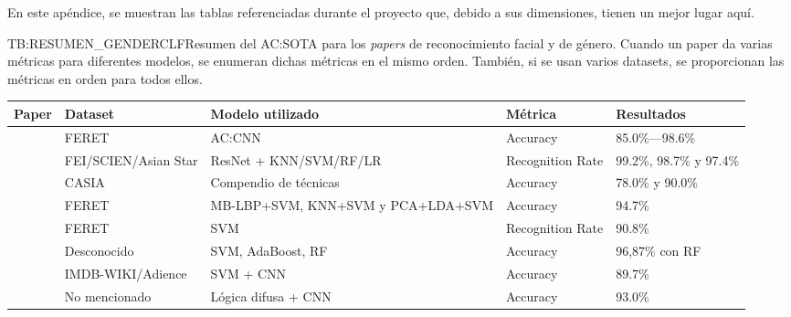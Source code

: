 En este apéndice, se muestran las tablas referenciadas durante el proyecto que, debido a sus dimensiones, tienen un mejor lugar aquí.



\begin{landscape}
\begin{table}[Resumen de papers género]{TB:RESUMEN_GENDERCLF}{Resumen del \ac{AC:SOTA} para los \textit{papers} de reconocimiento facial y de género. Cuando un paper da varias métricas para diferentes modelos, se enumeran dichas métricas en el mismo orden. También, si se usan varios datasets, se proporcionan las métricas en orden para todos ellos.}
  \begin{tabular}{cp{2.5cm}p{4cm}p{4cm}p{4cm}}
    \hline
    \textbf{Paper} & \textbf{Dataset} & \textbf{Modelo utilizado} & \textbf{Métrica} & \textbf{Resultados} \\
    \hline \hline
    \cite{vallimeena2019cnn} & FERET & \acs{AC:CNN} & Accuracy & 85.0\%---98.6\% \\
    \hline
    \cite{lin2020face} & FEI/SCIEN/Asian Star & ResNet + KNN/SVM/RF/LR & Recognition Rate & 99.2\%, 98.7\% y 97.4\% \\
    \hline
    \cite{hiremath2021human} & CASIA & Compendio de técnicas & Accuracy & 78.0\% y 90.0\% \\
    \hline
    \cite{tianyu2018human} & FERET & MB-LBP+SVM, KNN+SVM y PCA+LDA+SVM & Accuracy & 94.7\% \\
    \hline
    \cite{khryashchev2013adaptive} & FERET & SVM & Recognition Rate & 90.8\% \\
    \hline
    \cite{poornima2021classification} & Desconocido & SVM, AdaBoost, RF & Accuracy & 96,87\% con RF \\
    \hline
    \cite{agbo2019face} & IMDB-WIKI/Adience & SVM + CNN & Accuracy & 89.7\% \\
    \hline
    \cite{tuncc2020fuzzy} & No mencionado & Lógica difusa + CNN & Accuracy & 93.0\% \\

\end{tabular}
\end{table}
\end{landscape}
